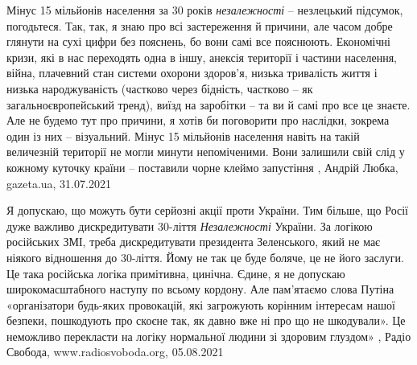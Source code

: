 Мінус 15 мільйонів населення за 30 років \emph{незалежності} – незлецький підсумок,
погодьтеся. Так, так, я знаю про всі застереження й причини, але часом добре
глянути на сухі цифри без пояснень, бо вони самі все пояснюють. Економічні
кризи, які в нас переходять одна в іншу, анексія території і частини населення,
війна, плачевний стан системи охорони здоров'я, низька тривалість життя і
низька народжуваність (частково через бідність, частково – як
загальноєвропейський тренд), виїзд на заробітки – та ви й самі про все це
знаєте.  Але не будемо тут про причини, я хотів би поговорити про наслідки, зокрема один
із них – візуальний. Мінус 15 мільйонів населення навіть на такій величезній
території не могли минути непоміченими. Вони залишили свій слід у кожному
куточку країни – поставили чорне клеймо запустіння
, 
Андрій Любка, gazeta.ua, 31.07.2021

Я допускаю, що можуть бути серйозні акції проти України. Тим більше, що Росії
дуже важливо дискредитувати 30-ліття \emph{Незалежності} України. За логікою
російських ЗМІ, треба дискредитувати президента Зеленського, який не має
ніякого відношення до 30-ліття. Йому не так це буде боляче, це не його заслуги.
Це така російська логіка примітивна, цинічна.  Єдине, я не допускаю
широкомасштабного наступу по всьому кордону. Але пам'ятаємо слова Путіна
«організатори будь-яких провокацій, які загрожують корінним інтересам нашої
безпеки, пошкодують про скоєне так, як давно вже ні про що не шкодували». Це
неможливо перекласти на логіку нормальної людини зі здоровим глуздом»
, 
Радіо Свобода, www.radiosvoboda.org, 05.08.2021
